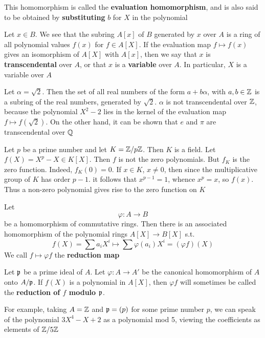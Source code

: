 \documentclass[11pt]{article}
\begin{document}
This homomorphism is called the \textbf{evaluation homomorphism}, and is also said to be obtained by
\textbf{substituting} \(b\) for \(X\) in the polynomial

Let \(x\in B\). We see that the subring \(A[x]\) of \(B\) generated by \(x\) over \(A\) is a ring
of all polynomial values \(f(x)\) for \(f\in A[X]\). If the evaluation map \(f\mapsto f(x)\) gives an
isomorphism of \(A[X]\) with \(A[x]\), then we say that \(x\) is \textbf{transcendental} over \(A\), or
that \(x\) is a \textbf{variable} over \(A\). In particular, \(X\) is a variable over \(A\)

\begin{examplle}[]
Let \(\alpha=\sqrt{2}\). Then the set of all real numbers of the form \(a+b\alpha\), with \(a,b\in\mathbb{Z}\) is a
subring of the real numbers, generated by \(\sqrt{2}\). \(\alpha\) is not transcendental over \(\mathbb{Z}\),
because the polynomial \(X^2-2\) lies in the kernel of the evaluation map \(f\mapsto f(\sqrt{2})\). On
the other hand, it can be shown that \(e\) and \(\pi\) are transcendental over \(\mathbb{Q}\)
\end{examplle}

\begin{examplle}[]
Let \(p\) be a prime number and let \(K=\mathbb{Z}/p\mathbb{Z}\). Then \(K\) is a field. Let \(f(X)=X^p-X\in K[X]\).
Then \(f\) is not the zero polynomials. But \(f_K\) is the zero function. Indeed, \(f_K(0)=0\).
If \(x\in K\), \(x\neq 0\), then since the multiplicative group of \(K\) has order \(p-1\). it follows
that \(x^{p-1}=1\), whence \(x^p=x\), so \(f(x)\). Thus a non-zero polynomial gives rise to the
zero function on \(K\)
\end{examplle}

Let
\begin{equation*}
\varphi:A\to B
\end{equation*}
be a homomorphism of commutative rings. Then there is an associated homomorphism of the
polynomial rings \(A[X]\to B[X]\) s.t.
\begin{equation*}
f(X)=\sum a_iX^i\mapsto\sum\varphi(a_i)X^i=(\varphi f)(X)
\end{equation*}
We call \(f\mapsto\varphi f\) the \textbf{reduction map}

Let \(\mathfrak{p}\) be a prime ideal of \(A\). Let \(\varphi:A\to A'\) be the canonical homomorphism of \(A\)
onto \(A/\mathfrak{p}\). If \(f(X)\) is a polynomial in \(A[X]\), then \(\varphi f\) will sometimes be called the
\textbf{reduction of \(f\) modulo \(\mathfrak{p}\)}.

For example, taking \(A=\mathbb{Z}\) and \(\mathfrak{p}=(p)\) for some prime number \(p\), we can speak of the
polynomial \(3X^4-X+2\) as a polynomial mod 5, viewing the coefficients as elements of \(\mathbb{Z}/5\mathbb{Z}\)
\end{document}
